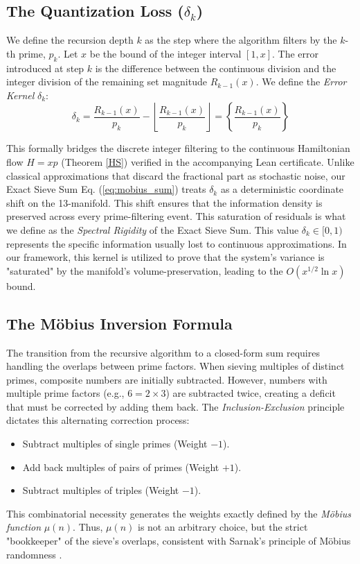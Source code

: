 \documentclass[sn-mathphys-num, pdflatex]{sn-jnl}
\begin{document}
\subsection{The Quantization Loss (\texorpdfstring{$\delta_k$}{delta\_k})}
We define the recursion depth $k$ as the step where the algorithm filters by the $k$-th prime, $p_k$.
Let $x$ be the bound of the integer interval $[1, x]$. The error introduced at step $k$ is the difference between the continuous division and the integer division of the remaining set magnitude $R_{k-1}(x)$. We define the \textit{Error Kernel} $\delta_k$:
\begin{equation}
\delta_{k} = \frac{R_{k-1}(x)}{p_{k}} - \left\lfloor \frac{R_{k-1}(x)}{p_{k}} \right\rfloor = \left\{ \frac{R_{k-1}(x)}{p_{k}} \right\}
\label{eq:quantization}
\end{equation}

This formally bridges the discrete integer filtering to the continuous Hamiltonian flow $H=xp$ (Theorem \ref{HS}) verified in the accompanying Lean certificate.
Unlike classical approximations that discard the fractional part as stochastic noise, our Exact Sieve Sum Eq. (\ref{eq:mobius_sum}) treats $\delta_k$ as a deterministic coordinate shift on the 13-manifold. This shift ensures that the information density is preserved across every prime-filtering event. This saturation of residuals is what we define as the \textit{Spectral Rigidity} of the Exact Sieve Sum. This value $\delta_k \in [0, 1)$ represents the specific information usually lost to continuous approximations. In our framework, this kernel is utilized to prove that the system's variance is "saturated" by the manifold's volume-preservation, leading to the $O(x^{1/2}\ln x)$ bound.

\subsection{The Möbius Inversion Formula}
The transition from the recursive algorithm to a closed-form sum requires handling the overlaps between prime factors. When sieving multiples of distinct primes, composite numbers are initially subtracted. However, numbers with multiple prime factors (e.g., $6 = 2 \times 3$) are subtracted twice, creating a deficit that must be corrected by adding them back. The \textit{Inclusion-Exclusion} principle dictates this alternating correction process:
\begin{itemize}
    \item Subtract multiples of single primes (Weight $-1$).
    \item Add back multiples of pairs of primes (Weight $+1$).
    \item Subtract multiples of triples (Weight $-1$).
\end{itemize}
This combinatorial necessity generates the weights exactly defined by the \textit{Möbius function} $\mu(n)$. Thus, $\mu(n)$ is not an arbitrary choice, but the strict "bookkeeper" of the sieve's overlaps, consistent with Sarnak's principle of Möbius randomness \cite{sarnak}.
\end{document}
